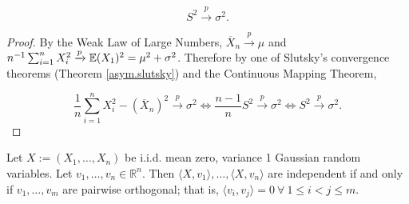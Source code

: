 \begin{proposition}

\[
S^2 \xrightarrow{p} \sigma^2.
\]

\end{proposition}

\begin{proof}

By the Weak Law of Large Numbers, \(\overline{X}_n \xrightarrow{p} \mu\) and \(n^{-1} \sum_{i=1}^n X_i^2 \xrightarrow{p} \E(X_1)^2 = \mu^2 + \sigma^2\). Therefore by one of Slutsky's convergence theorems (Theorem \ref{asym.slutsky}) and the Continuous Mapping Theorem, 

\[
\frac{1}{n}   \sum_{i=1}^n X_i^2 - (\overline{X}_n)^2 \xrightarrow{p} \sigma^2 \iff \frac{n-1}{n} S^2 \xrightarrow{p} \sigma^2 \iff S^2 \xrightarrow{p} \sigma^2.
\]

\end{proof}

\begin{lemma}\label{stats.hw3.ex.3.16} Let \(X := (X_1, \ldots, X_n)\) be i.i.d. mean zero, variance 1 Gaussian random variables. Let \(v_1, \ldots, v_n \in \mathbb{R}^n\). Then \(\langle X, v_1 \rangle, \ldots, \langle X, v_n \rangle\) are independent if and only if \(v_1, \ldots, v_m \) are pairwise orthogonal; that is,  \(\langle v_i, v_j \rangle = 0 \ \forall \ 1 \leq i < j \leq m\). 

\end{lemma}

